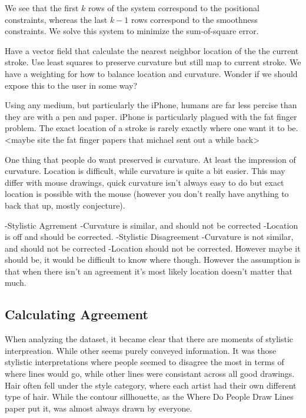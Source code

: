 We see that the first $k$ rows of the system correspond to the positional constraints, whereas the last $k-1$ rows correspond to the smoothness constraints.  We solve this system to minimize the sum-of-square error.


Have a vector field that calculate the nearest neighbor location of the the current stroke.
Use least squares to preserve curvature but still map to current stroke.
We have a weighting for how to balance location and curvature. Wonder if we should expose this to the user in some way?


Using any medium, but particularly the iPhone, humans are far less percise than they are with a pen and paper. iPhone is particularly plagued with the fat finger problem. The exact location of a stroke is rarely exactly where one want it to be. <maybe site the fat finger papers that michael sent out a while back>

One thing that people do want preserved is curvature. At least the impression of curvature. Location is difficult, while curvature is quite a bit easier. This may differ with mouse drawings, quick curvature isn't always easy to do but exact location is possible with the mouse (however you don't really have anything to back that up, mostly conjecture).

-Stylistic Agrrement
	-Curvature is similar, and should not be corrected
	-Location is off and should be corrected.
-Stylistic Disagreement
	-Curvature is not similar, and should not be corrected
	-Location should not be corrected. However maybe it should be, it would be difficult to know where though. However the assumption is that when there isn't an agreement it's most likely location doesn't matter that much.

\subsection{Calculating Agreement}
When analyzing the dataset, it became clear that there are moments of stylistic interpreation. While other seems purely conveyed information. It was those stylistic interpretations where people seemed to disagree the most in terms of where lines would go, while other lines were consistant across all good drawings. Hair often fell under the style category, where each artist had their own different type of hair. While the contour sillhouette, as the Where Do People Draw Lines paper put it, was almost always drawn by everyone.

